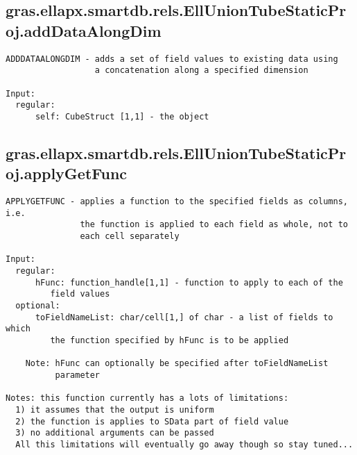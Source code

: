 \subsection{\texorpdfstring{gras.ellapx.smartdb.rels.EllUnionTubeStaticProj.addDataAlongDim}{addDataAlongDim}}\label{method:gras.ellapx.smartdb.rels.EllUnionTubeStaticProj.addDataAlongDim}
\begin{verbatim}
ADDDATAALONGDIM - adds a set of field values to existing data using
                  a concatenation along a specified dimension

Input:
  regular:
      self: CubeStruct [1,1] - the object
\end{verbatim}
\subsection{\texorpdfstring{gras.ellapx.smartdb.rels.EllUnionTubeStaticProj.applyGetFunc}{applyGetFunc}}\label{method:gras.ellapx.smartdb.rels.EllUnionTubeStaticProj.applyGetFunc}
\begin{verbatim}
APPLYGETFUNC - applies a function to the specified fields as columns, i.e.
               the function is applied to each field as whole, not to
               each cell separately

Input:
  regular:
      hFunc: function_handle[1,1] - function to apply to each of the
         field values
  optional:
      toFieldNameList: char/cell[1,] of char - a list of fields to which
         the function specified by hFunc is to be applied

    Note: hFunc can optionally be specified after toFieldNameList
          parameter

Notes: this function currently has a lots of limitations:
  1) it assumes that the output is uniform
  2) the function is applies to SData part of field value
  3) no additional arguments can be passed
  All this limitations will eventually go away though so stay tuned...
\end{verbatim}
